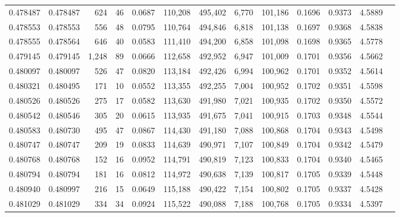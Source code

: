 \begin{tabular}{rrrrrrrrrrrrr}
0.478487 & 0.478487 &   624 &    46 &                                     0.0687 & 110,208 & 495,402 &   6,770 & 101,186 & 0.1696 & 0.9373 & 4.5889 \\
0.478553 & 0.478553 &   556 &    48 &                                     0.0795 & 110,764 & 494,846 &   6,818 & 101,138 & 0.1697 & 0.9368 & 4.5838 \\
0.478555 & 0.478564 &   646 &    40 &                                     0.0583 & 111,410 & 494,200 &   6,858 & 101,098 & 0.1698 & 0.9365 & 4.5778 \\
0.479145 & 0.479145 & 1,248 &    89 &                                     0.0666 & 112,658 & 492,952 &   6,947 & 101,009 & 0.1701 & 0.9356 & 4.5662 \\
0.480097 & 0.480097 &   526 &    47 &                                     0.0820 & 113,184 & 492,426 &   6,994 & 100,962 & 0.1701 & 0.9352 & 4.5614 \\
0.480321 & 0.480495 &   171 &    10 &                                     0.0552 & 113,355 & 492,255 &   7,004 & 100,952 & 0.1702 & 0.9351 & 4.5598 \\
0.480526 & 0.480526 &   275 &    17 &                                     0.0582 & 113,630 & 491,980 &   7,021 & 100,935 & 0.1702 & 0.9350 & 4.5572 \\
0.480542 & 0.480546 &   305 &    20 &                                     0.0615 & 113,935 & 491,675 &   7,041 & 100,915 & 0.1703 & 0.9348 & 4.5544 \\
0.480583 & 0.480730 &   495 &    47 &                                     0.0867 & 114,430 & 491,180 &   7,088 & 100,868 & 0.1704 & 0.9343 & 4.5498 \\
0.480747 & 0.480747 &   209 &    19 &                                     0.0833 & 114,639 & 490,971 &   7,107 & 100,849 & 0.1704 & 0.9342 & 4.5479 \\
0.480768 & 0.480768 &   152 &    16 &                                     0.0952 & 114,791 & 490,819 &   7,123 & 100,833 & 0.1704 & 0.9340 & 4.5465 \\
0.480794 & 0.480794 &   181 &    16 &                                     0.0812 & 114,972 & 490,638 &   7,139 & 100,817 & 0.1705 & 0.9339 & 4.5448 \\
0.480940 & 0.480997 &   216 &    15 &                                     0.0649 & 115,188 & 490,422 &   7,154 & 100,802 & 0.1705 & 0.9337 & 4.5428 \\
0.481029 & 0.481029 &   334 &    34 &                                     0.0924 & 115,522 & 490,088 &   7,188 & 100,768 & 0.1705 & 0.9334 & 4.5397 \\

\end{tabular}
